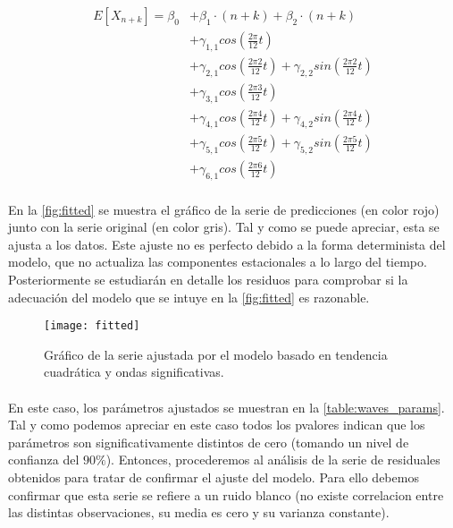 \documentclass[a4paper, spanish]{article}
\begin{document}
    \begin{equation}
    \label{eq:significative_waves}
      \begin{split}
        E[X_{n + k}] = \beta_0 &+ \beta_1 \cdot (n + k) + \beta_2 \cdot(n + k) \\
        &+ \gamma_{1,1} cos\left(\frac{2 \pi  }{12} t\right) \\
        &+ \gamma_{2,1} cos\left(\frac{2 \pi 2}{12} t\right) + \gamma_{2,2} sin\left(\frac{2 \pi 2}{12} t\right) \\
        &+ \gamma_{3,1} cos\left(\frac{2 \pi 3}{12} t\right) \\
        &+ \gamma_{4,1} cos\left(\frac{2 \pi 4}{12} t\right) + \gamma_{4,2} sin\left(\frac{2 \pi 4}{12} t\right) \\
        &+ \gamma_{5,1} cos\left(\frac{2 \pi 5}{12} t\right) + \gamma_{5,2} sin\left(\frac{2 \pi 5}{12} t\right) \\
        &+ \gamma_{6,1} cos\left(\frac{2 \pi 6}{12} t\right)
      \end{split}
    \end{equation}

    \paragraph{}
    En la \autoref{fig:fitted} se muestra el gráfico de la serie de predicciones (en color rojo) junto con la serie original (en color gris). Tal y como se puede apreciar, esta se ajusta a los datos. Este ajuste no es perfecto debido a la forma determinista del modelo, que no actualiza las componentes estacionales a lo largo del tiempo. Posteriormente se estudiarán en detalle los residuos para comprobar si la adecuación del modelo que se intuye en la \autoref{fig:fitted} es razonable.

    \begin{figure}[htb!]
      \centering
      \texttt{[image: fitted]}
      \caption{Gráfico de la serie ajustada por el modelo basado en tendencia cuadrática y ondas significativas.}
      \label{fig:fitted}
    \end{figure}

    \paragraph{}
    En este caso, los parámetros ajustados se muestran en la \autoref{table:waves_params}. Tal y como podemos apreciar en este caso todos los pvalores indican que los parámetros son significativamente distintos de cero (tomando un nivel de confianza del $90\%$). Entonces, procederemos al análisis de la serie de residuales obtenidos para tratar de confirmar el ajuste del modelo. Para ello debemos confirmar que esta serie se refiere a un ruido blanco (no existe correlacion entre las distintas observaciones, su media es cero y su varianza constante).
\end{document}

